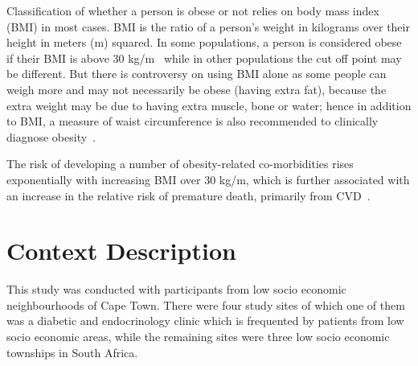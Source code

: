 Classification of whether a person is obese or not relies on body mass index (BMI) in most cases. BMI is the ratio of a person’s weight in kilograms over their height in meters (m) squared. In some populations, a person is considered obese if their BMI is above 30 kg/m~\citep{steyn2006chronic} while in other populations the cut off point may be different. But there is controversy on using BMI alone as some people can weigh more and may not necessarily be obese (having extra fat), because the extra weight may be due to having extra muscle, bone or water; hence in addition to BMI, a measure of waist circumference is also recommended to clinically diagnose obesity~\citep{janssen2004waist}.  

The risk of developing a number of obesity-related co-morbidities rises exponentially with increasing BMI over 30 kg/m, which is further associated with an increase in the relative risk of premature death, primarily from CVD~\citep{de2000clinical}.
 
\section{Context Description}
This study was conducted with participants from low socio economic neighbourhoods of Cape Town. There were four study sites of which one of them was a diabetic and endocrinology clinic which is frequented by patients from low socio economic areas, while the remaining sites were three low socio economic townships in South Africa. 

